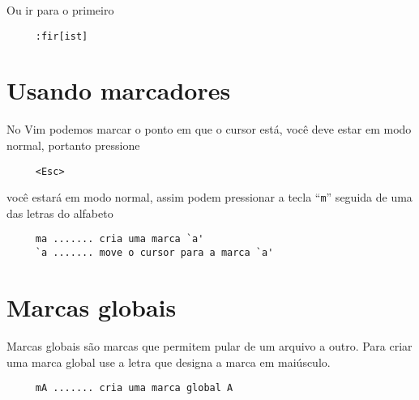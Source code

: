 Ou ir para o primeiro

\begin{verbatim}
     :fir[ist]
\end{verbatim}

\section{Usando marcadores}
\label{Usando marcadores}

No Vim podemos marcar o ponto em que o cursor está, você deve estar em
modo normal, portanto pressione

\begin{verbatim}
     <Esc>
\end{verbatim}

você estará em modo normal, assim podem pressionar a tecla ``\verb+m+''
seguida de uma das letras do alfabeto

\begin{verbatim}
     ma ....... cria uma marca `a'
     `a ....... move o cursor para a marca `a'
\end{verbatim}

\section{Marcas globais}
\label{Marcas globais}
Marcas globais são marcas que permitem pular de um arquivo a outro.
Para criar uma marca global use a letra que designa a marca em
maiúsculo.

\begin{verbatim}
     mA ....... cria uma marca global A
\end{verbatim}
